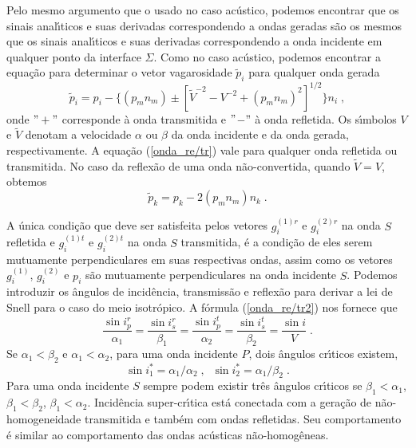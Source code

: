 Pelo mesmo argumento que o usado no caso ac\'ustico, podemos
encontrar que os sinais anal\'{\i}ticos e suas derivadas
correspondendo a ondas geradas s\~ao os mesmos que os sinais
anal\'{\i}ticos e suas derivadas correspondendo a onda incidente
em qualquer ponto da interface $\Sigma$. Como no caso ac\'ustico,
podemos encontrar a equa\c{c}\~ao para determinar o vetor
vagarosidade $\tilde{p}_i$ para qualquer onda gerada
\begin{equation}
\tilde{p}_i = p_i
-\{(p_mn_m)\pm[\tilde{V}^{-2}-V^{-2}+(p_mn_m)^2]^{1/2}\}n_i \;,
\label{onda_re/tr}
\end{equation}
onde $"+"$ corresponde \`a onda transmitida e $"$$-"$  \`a onda
refletida. Os s\'{\i}mbolos $V$ e $\tilde{V}$ denotam a velocidade
$\alpha$ ou $\beta$ da onda incidente e da onda gerada,
respectivamente. A equa\c{c}\~ao (\ref{onda_re/tr}) vale para
qualquer onda refletida ou transmitida. No caso da reflex\~ao de
uma onda n\~ao-convertida, quando $\tilde{V}=V$, obtemos
\begin{equation}
\tilde{p}_k = p_k -2(p_mn_m)n_k \;. \label{onda_re/tr2}
\end{equation}

A \'unica condi\c{c}\~ao que deve ser satisfeita pelos vetores
$g_i^{(1)r}$ e $g_i^{(2)r}$ na onda $S$ refletida e $g_i^{(1)t}$ e
$g_i^{(2)t}$ na onda $S$ transmitida, \'e a condi\c{c}\~ao de eles
serem mutuamente perpendiculares em suas respectivas ondas, assim
como os vetores $g_i^{(1)}$, $g_i^{(2)}$ e $p_i$ s\~ao mutuamente
perpendiculares na onda incidente $S$. Podemos introduzir os
\^angulos de incid\^encia, transmiss\~ao e reflex\~ao para derivar
a lei de Snell para o caso do meio isotr\'opico. A f\'ormula
(\ref{onda_re/tr2}) nos fornece que
\begin{equation}
\frac{\sin{i_p^r}}{\alpha_1}=\frac{\sin{i_s^r}}{\beta_1}=\frac{\sin{i_p^t}}{\alpha_2}=\frac{\sin{i_s^t}}{\beta_2}=\frac{\sin{i}}{V}
\;. \label{Snell}
\end{equation}
Se $\alpha_1<\beta_2$ e $\alpha_1<\alpha_2$, para uma onda
incidente $P$, dois \^angulos cr\'{\i}ticos existem,
\begin{equation}
\sin{i_1^*}=\alpha_1/\alpha_2 \;, \;\;
\sin{i_2^*}=\alpha_1/\beta_2\;.
\end{equation}
Para uma onda incidente $S$ sempre podem existir tr\^es \^angulos
cr\'{\i}ticos se $\beta_1<\alpha_1$, $\beta_1<\beta_2$,
$\beta_1<\alpha_2$. Incid\^encia super-cr\'{\i}tica est\'a
conectada com a gera\c{c}\~ao de n\~ao-homogeneidade transmitida e
tamb\'em com ondas refletidas. Seu comportamento \'e similar ao
comportamento das ondas ac\'usticas n\~ao-homog\^eneas.


